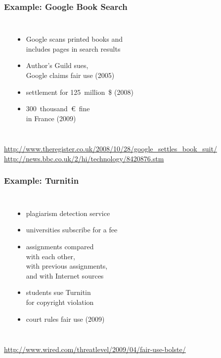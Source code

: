 \documentclass[dvipsnames]{beamer}
\theoremstyle{plain}
\begin{document}
\begin{frame}
  \frametitle{Example: Google Book Search}

  \begin{columns}
    \begin{center}
    \end{center}

    \begin{itemize}
      \item Google scans printed books and\\
        includes pages in search results
      \item Author's Guild sues,\\
        Google claims fair use (2005)
      \item settlement for 125~million~\$ (2008)
      \item 300~thousand~\euro~fine\\
        in France (2009)
    \end{itemize}
  \end{columns}

  \medskip
  \tiny{\url{http://www.theregister.co.uk/2008/10/28/google_settles_book_suit/}}\\
  \tiny{\url{http://news.bbc.co.uk/2/hi/technology/8420876.stm}}\\
\end{frame}

\begin{frame}
  \frametitle{Example: Turnitin}

  \begin{columns}
    \begin{center}
    \end{center}

    \begin{itemize}
      \item plagiarism detection service
      \item universities subscribe for a fee
      \item assignments compared\\
        with each other,\\
        with previous assignments,\\
        and with Internet sources
      \item students sue Turnitin\\
        for copyright violation
      \item court rules fair use (2009)
    \end{itemize}
  \end{columns}

  \medskip
  \tiny{\url{http://www.wired.com/threatlevel/2009/04/fair-use-bolste/}}\\
\end{frame}
\end{document}
